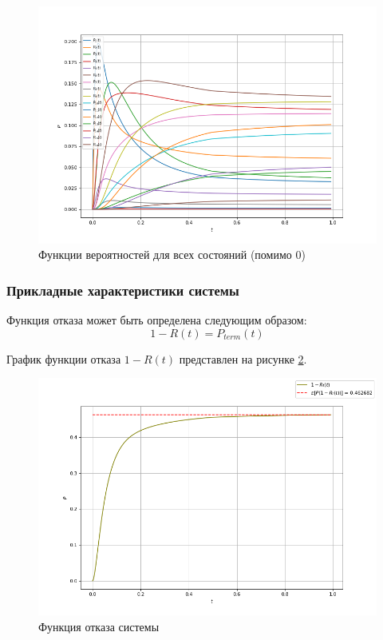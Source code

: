 \begin{figure}[H]
\centerline{\includegraphics[width=\textwidth]{Images/P_i.png}}
\caption{Функции вероятностей для всех состояний (помимо 0) }
\label{P_i}
\end{figure}

\subsubsection{Прикладные характеристики системы}

Функция отказа может быть определена следующим образом:
$$1-R(t) = P_{term}(t)$$

График функции отказа $1-R(t)$ представлен на рисунке \ref{R_t}.
\begin{figure}[H]
\centerline{\includegraphics[width=\textwidth]{Images/R_t.png}}
\caption{Функция отказа системы}
\label{R_t}
\end{figure}


